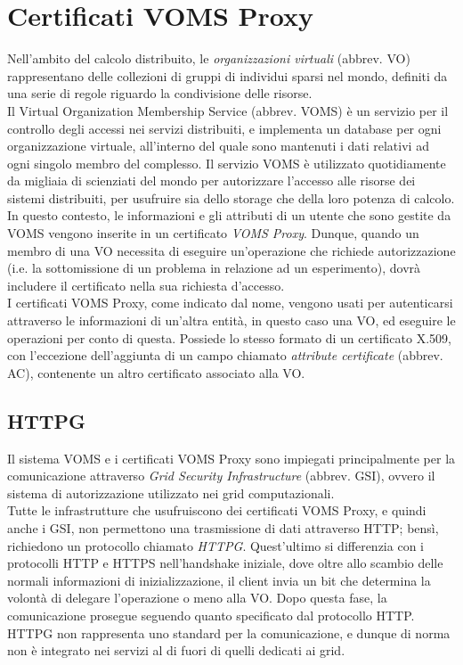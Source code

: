 \section{Certificati VOMS Proxy}
Nell'ambito del calcolo distribuito, le \textit{organizzazioni virtuali} (abbrev. VO) rappresentano delle collezioni di gruppi 
di individui sparsi nel mondo, definiti da una serie di regole riguardo la condivisione delle risorse. 
\\Il Virtual Organization Membership Service (abbrev. VOMS) è un servizio per il controllo degli accessi 
nei servizi distribuiti, e implementa
un database per ogni organizzazione virtuale, all'interno del
quale sono mantenuti i dati relativi ad ogni singolo membro del complesso. Il servizio VOMS è utilizzato quotidiamente da 
migliaia di scienziati del mondo per autorizzare l'accesso alle risorse dei sistemi distribuiti, per usufruire sia dello storage che della 
loro potenza di calcolo. 
\\ In questo contesto, le informazioni e gli attributi di un utente che sono gestite da VOMS vengono inserite in un certificato \textit{VOMS Proxy}.
Dunque, quando un membro di una VO necessita di eseguire un'operazione che richiede autorizzazione (i.e. la sottomissione di un problema in relazione ad un esperimento), 
dovrà includere il certificato nella sua richiesta d'accesso. 
\\ I certificati VOMS Proxy, come indicato dal nome, vengono usati per autenticarsi attraverso le informazioni di un'altra entità, in questo caso una VO, ed eseguire le operazioni
per conto di questa. Possiede lo stesso formato di un certificato X.509, con l'eccezione dell'aggiunta di un campo chiamato \textit{attribute certificate} (abbrev. AC),
 contenente un altro certificato associato alla VO. 

\subsection{HTTPG}
Il sistema VOMS e i certificati VOMS Proxy sono impiegati principalmente per la comunicazione attraverso \textit{Grid Security Infrastructure} (abbrev. GSI), ovvero 
il sistema di autorizzazione utilizzato nei grid computazionali. 
\\Tutte le infrastrutture che usufruiscono dei certificati VOMS Proxy, e quindi anche i GSI, non permettono una trasmissione di dati attraverso HTTP; bensì, richiedono un protocollo chiamato \textit{HTTPG}.
Quest'ultimo si differenzia con i protocolli HTTP e HTTPS nell'handshake iniziale, dove oltre allo scambio delle normali informazioni di inizializzazione, il client invia un bit che determina la volontà di delegare l'operazione o meno alla VO.
Dopo questa fase, la comunicazione prosegue seguendo quanto specificato dal protocollo HTTP.    
\\ HTTPG non rappresenta uno standard per la comunicazione, e dunque di norma non è integrato nei servizi al di fuori di quelli dedicati ai grid.  

